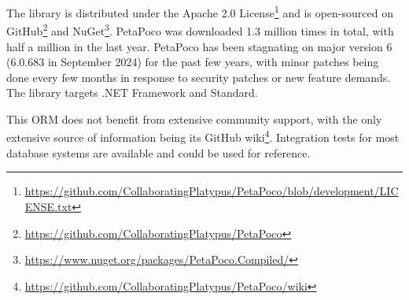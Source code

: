 The library is distributed under the Apache 2.0 License\footnote{\url{https://github.com/CollaboratingPlatypus/PetaPoco/blob/development/LICENSE.txt}} and is open-sourced on GitHub\footnote{\url{https://github.com/CollaboratingPlatypus/PetaPoco}} and NuGet\footnote{\url{https://www.nuget.org/packages/PetaPoco.Compiled/}}. PetaPoco was downloaded 1.3 million times in total, with half a million in the last year. PetaPoco has been stagnating on major version 6 (6.0.683 in September 2024) for the past few years, with minor patches being done every few months in response to security patches or new feature demands. The library targets .NET Framework and Standard.

This ORM does not benefit from extensive community support, with the only extensive source of information being its GitHub wiki\footnote{\url{https://github.com/CollaboratingPlatypus/PetaPoco/wiki}}. Integration tests for most database systems are available and could be used for reference.


